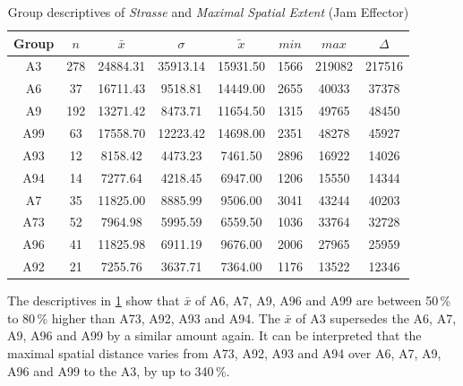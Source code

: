 \begin{table}[ht]
	\tiny
	\centering
	\begin{tabular}{c|c|c|c|c|c|c|c}
		\toprule
		Group & $n$ & $\bar{x}$ & $\sigma$ & $\tilde{x}$ & $min$ & $max$ & $\Delta$ \\
		\midrule
		A3   & 278 & 24884.31 & 35913.14 & 15931.50 & 1566 & 219082 & 217516 \\ 
		A6   & 37  & 16711.43 & 9518.81  & 14449.00 & 2655 & 40033  & 37378 \\ 
		A9   & 192 & 13271.42 & 8473.71  & 11654.50 & 1315 & 49765  & 48450 \\ 
		A99  & 63  & 17558.70 & 12223.42 & 14698.00 & 2351 & 48278  & 45927 \\ 
		A93  & 12  & 8158.42  & 4473.23  & 7461.50  & 2896 & 16922  & 14026 \\ 
		A94  & 14  & 7277.64  & 4218.45  & 6947.00  & 1206 & 15550  & 14344 \\ 
		A7   & 35  & 11825.00 & 8885.99  & 9506.00  & 3041 & 43244  & 40203 \\ 
		A73  & 52  & 7964.98  & 5995.59  & 6559.50  & 1036 & 33764  & 32728 \\ 
		A96  & 41  & 11825.98 & 6911.19  & 9676.00  & 2006 & 27965  & 25959 \\ 
		A92  & 21  & 7255.76  & 3637.71  & 7364.00  & 1176 & 13522  & 12346 \\ 
		\bottomrule
	  \end{tabular}
    \caption{Group descriptives of \textit{Strasse} and \textit{Maximal Spatial Extent} (Jam Effector)}
    \label{tbl:descriptives_baysis_effector_Strasse_SMax}
\end{table}
The descriptives in \cref{tbl:descriptives_baysis_effector_Strasse_SMax} show that $\bar{x}$ of A6, A7, A9, A96 and A99 are between 50\,\% to 80\,\% higher than A73, A92, A93 and A94. The $\bar{x}$ of A3 supersedes the A6, A7, A9, A96 and A99 by a similar amount again. It can be interpreted that the maximal spatial distance varies from A73, A92, A93 and A94 over A6, A7, A9, A96 and A99 to the A3, by up to 340\,\%.

